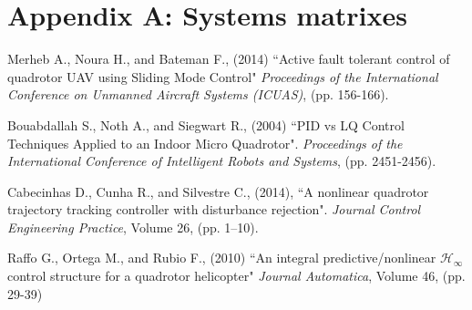 \documentclass[12pt]{article}
\begin{document}
\section{Appendix A: Systems matrixes}


 
\begin{thebibliography}{100} %
 Merheb A., Noura H., and Bateman F., (2014)
``Active fault tolerant control of quadrotor UAV using Sliding Mode Control"
\emph{Proceedings of the International Conference on Unmanned Aircraft Systems (ICUAS)},
(pp. 156-166).

 Bouabdallah S., Noth A., and Siegwart R., (2004) 
``PID vs LQ Control Techniques Applied to an Indoor Micro Quadrotor". 
\emph{Proceedings of the International Conference of Intelligent Robots and Systems}, 
(pp. 2451-2456).

 Cabecinhas D., Cunha R., and Silvestre C., (2014),
``A nonlinear quadrotor trajectory tracking controller with disturbance rejection".
\emph{Journal Control Engineering Practice}, Volume 26, (pp. 1–10).

 Raffo G., Ortega M., and Rubio F., (2010)
``An integral predictive/nonlinear $\mathcal{H} _\infty$ control structure for a quadrotor helicopter"
\emph{Journal Automatica}, Volume 46, (pp. 29-39)
\end{thebibliography}
\end{document}
